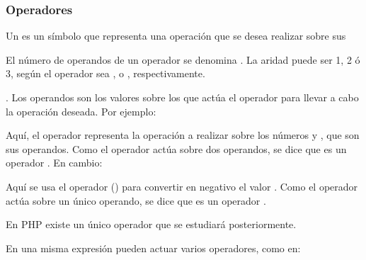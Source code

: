 \documentclass[a4paper,12pt,spanish]{sphinxmanual}
\begin{document}
\subsubsection{Operadores}
\label{\detokenize{php:operadores}}
\ignorespaces 
Un  es un símbolo que representa una operación que se desea
realizar sobre sus  %
\begin{footnote}[2]\sphinxAtStartFootnote
El número de operandos de un operador se denomina . La aridad
puede ser 1, 2 ó 3, según el operador sea ,  o ,
respectivamente.
%
\end{footnote}. Los operandos son los valores
sobre los que actúa el operador para llevar a cabo la operación deseada. Por
ejemplo:

%
\begin{sphinxVerbatim}[commandchars=\\\{\}]
  
\end{sphinxVerbatim}

Aquí, el operador \sphinxcode{\sphinxupquote{+}} representa la operación  a realizar sobre los
números  y , que son sus operandos. Como el operador actúa sobre dos
operandos, se dice que es un operador . En cambio:

%
\begin{sphinxVerbatim}[commandchars=\\\{\}]
\end{sphinxVerbatim}

Aquí se usa el operador \sphinxcode{\sphinxupquote{-}} () para convertir en negativo el
valor . Como el operador actúa sobre un único operando, se dice que es un
operador .

En PHP existe un único operador  que se estudiará posteriormente.

En una misma expresión pueden actuar varios operadores, como en:

%
\begin{sphinxVerbatim}[commandchars=\\\{\}]
    
\end{sphinxVerbatim}
\end{document}
